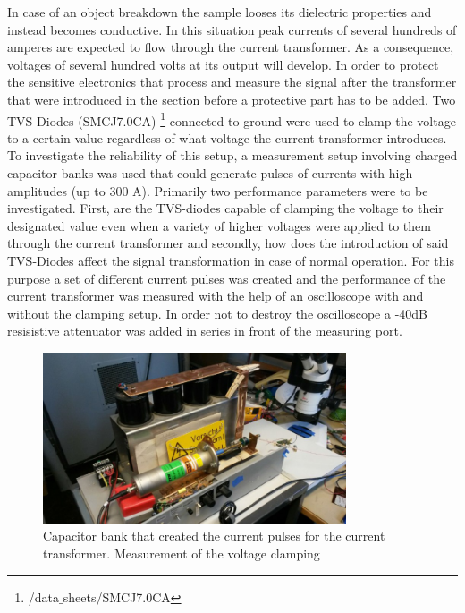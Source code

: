 In case of an object breakdown the sample looses its dielectric properties and instead becomes conductive.
In this situation peak currents of several hundreds of amperes are expected to flow through the current transformer.
As a consequence, voltages of several hundred volts at its output will develop. In order to protect the sensitive electronics that
process and measure the signal after the transformer that were introduced in the section before a protective part has to be added.
Two TVS-Diodes (SMCJ7.0CA) \footnote{/data$\_$sheets/SMCJ7.0CA} connected to ground were used to clamp the voltage to a certain value regardless of what voltage the current transformer introduces.
To investigate the reliability of this setup, a measurement setup involving charged capacitor banks was used that could generate
pulses of currents with high amplitudes (up to 300 A). 
Primarily two performance parameters were to be investigated. First, are the TVS-diodes capable of clamping the voltage to their designated value even when
a variety of higher voltages were applied to them through the current transformer and secondly, how does the introduction of said TVS-Diodes affect the
signal transformation in case of normal operation. 
\newline
For this purpose a set of different current pulses was created and the performance of the current transformer was measured with the help of an
oscilloscope with and without the clamping setup. In order not to destroy the oscilloscope a -40dB resisistive attenuator was added in series in front of
the measuring port.

\begin{figure}[h!tb]
\centerline{\includegraphics[width=0.8\textwidth]{figures/Method/Clamp/capacitorbank.jpg}}
    \caption{Capacitor bank that created the current pulses for the current transformer. Measurement of the voltage clamping}
    \label{fig.clamp}
\end{figure}



